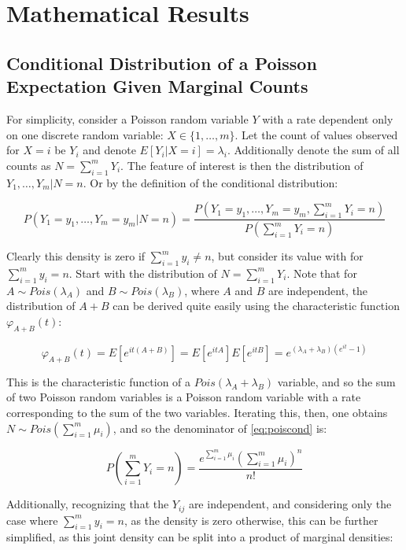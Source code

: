 \chapter{Mathematical Results} \label{app:mathres}

\section{Conditional Distribution of a Poisson Expectation Given Marginal Counts}

For simplicity, consider a Poisson random variable $Y$ with a rate dependent only on one discrete random variable: $X \in \{1,
\dots, m\}$. Let the count of values observed for $X = i$ be $Y_i$ and denote $E[Y_i | X = i] = \lambda_i$. Additionally denote
the sum of all counts as $N = \sum_{i = 1}^m Y_i$. The feature of interest is then the distribution of $Y_1, \dots, Y_m | N =
n$. Or by the definition of the conditional distribution:

\begin{equation}
  P (Y_1 = y_1 ,\dots, Y_m = y_m | N = n) = \frac{P(Y_1 = y_1, \dots, Y_m = y_m, \sum_{i = 1}^{m} Y_i = n)}{P(\sum_{i =
        1}^{m} Y_i = n)}
  \label{eq:poiscond}
\end{equation}

Clearly this density is zero if $\sum_{i=1}^m y_i \neq n$, but consider its value with for $\sum_{i=1}^m y_i = n$. Start with
the distribution of $N = \sum_{i = 1}^{m} Y_i$. Note that for $A \sim Pois(\lambda_A)$ and $B \sim Pois(\lambda_B)$, where $A$ and
$B$ are independent, the distribution of $A + B$ can be derived quite easily using the characteristic function $\varphi_{A+B}(t)$:

$$\varphi_{A+B}(t) = E[e^{it(A+B)}] = E[e^{itA}]E[e^{itB}] = e^{(\lambda_A + \lambda_B)(e^{it} - 1)}$$

This is the characteristic function of a $Pois(\lambda_A + \lambda_B)$ variable, and so the sum of two Poisson random variables is
a Poisson random variable with a rate corresponding to the sum of the two variables. Iterating this, then, one obtains $N \sim
Pois(\sum_{i=1}^m \mu_i)$, and so the denominator of \ref{eq:poiscond} is:

$$P \left (\sum_{i = 1}^m Y_i = n \right ) = \frac{e^{\sum_{i=1}^m \mu_i} (\sum_{i=1}^m \mu_i)^n}{n!}$$

Additionally, recognizing that the $Y_{ij}$ are independent, and considering only the case where $\sum_{i=1}^m y_i = n$, as the
density is zero otherwise, this can be further simplified, as this joint density can be split into a product of marginal
densities: 


